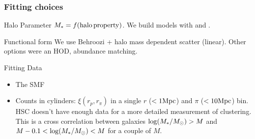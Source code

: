 \documentclass[t]{beamer}
\begin{document}
\begin{frame}
    \frametitle{Fitting choices}

    \begin{block}{Halo Parameter}
        $M_{\ast}{} = f({\rm halo\, property})$. We build models with \vmp{} and \MhaloPeak{}.
    \end{block}

    \begin{block}{Functional form}
        We use Behroozi + halo mass dependent scatter (linear). Other options were an HOD, abundance matching.
    \end{block}

    \begin{block}{Fitting Data}
        \begin{itemize}
            \item The SMF
            \item Counts in cylinders: $\xi(r_p, r_{\pi})$ in a single $r$ ($< 1{\rm Mpc}$) and $\pi$ ($< 10{\rm Mpc}$) bin. HSC doesn't have enough data for a more detailed measurement of clustering. This is a cross correlation between galaxies ${\rm log}{}(M_{\ast}{} / \mbox{$M_{\odot}$}{}) > M$ and $M - 0.1 < {\rm log}{}(M_{\ast}{} / \mbox{$M_{\odot}$}{}) < M$ for a couple of $M$.
        \end{itemize}
    \end{block}

\end{frame}
\end{document}
